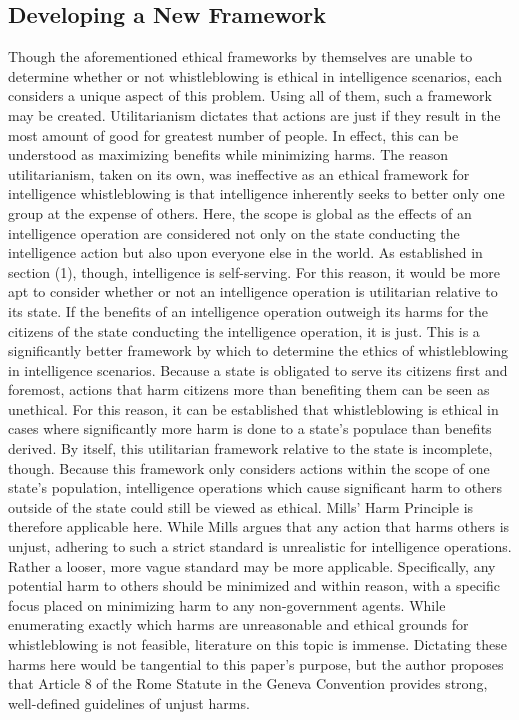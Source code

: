 \documentclass [12 pt] {article}
\begin{document}
\subsection{Developing a New Framework}
Though the aforementioned ethical frameworks by themselves are unable to determine whether or not whistleblowing is ethical in intelligence scenarios, each considers a unique aspect of this problem. Using all of them, such a framework may be created.
\bigbreak
Utilitarianism dictates that actions are just if they result in the most amount of good for greatest number of people. In effect, this can be understood as maximizing benefits while minimizing harms. The reason utilitarianism, taken on its own, was ineffective as an ethical framework for intelligence whistleblowing is that intelligence inherently seeks to better only one group at the expense of others. Here, the scope is global as the effects of an intelligence operation are considered not only on the state conducting the intelligence action but also upon everyone else in the world. As established in section (1), though, intelligence is self-serving. For this reason, it would be more apt to consider whether or not an intelligence operation is utilitarian relative to its state. If the benefits of an intelligence operation outweigh its harms for the citizens of the state conducting the intelligence operation, it is just. This is a significantly better framework by which to determine the ethics of whistleblowing in intelligence scenarios. Because a state is obligated to serve its citizens first and foremost, actions that harm citizens more than benefiting them can be seen as unethical. For this reason, it can be established that whistleblowing is ethical in cases where significantly more harm is done to a state's populace than benefits derived.
\bigbreak
By itself, this utilitarian framework relative to the state is incomplete, though. Because this framework only considers actions within the scope of one state's population, intelligence operations which cause significant harm to others outside of the state could still be viewed as ethical. Mills' Harm Principle is therefore applicable here. While Mills argues that any action that harms others is unjust, adhering to such a strict standard is unrealistic for intelligence operations. Rather a looser, more vague standard may be more applicable. Specifically, any potential harm to others should be minimized and within reason, with a specific focus placed on minimizing harm to any non-government agents. While enumerating exactly which harms are unreasonable and ethical grounds for whistleblowing is not feasible, literature on this topic is immense. Dictating these harms here would be tangential to this paper's purpose, but the author proposes that Article 8 of the Rome Statute in the Geneva Convention provides strong, well-defined guidelines of unjust harms.
\end{document}
